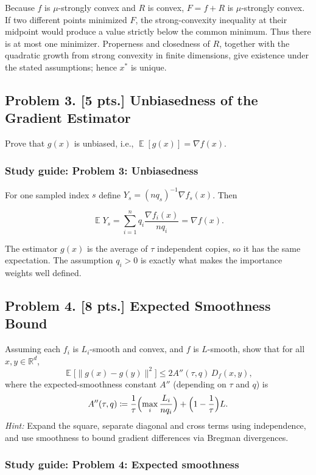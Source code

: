 \documentclass[11pt,a4paper]{article}
\DeclareMathOperator{\E}{\mathbb{E}}
\begin{document}
Because $f$ is $\mu$-strongly convex and $R$ is convex, $F=f+R$ is $\mu$-strongly convex. If two different points minimized $F$, the strong-convexity inequality at their midpoint would produce a value strictly below the common minimum. Thus there is at most one minimizer. Properness and closedness of $R$, together with the quadratic growth from strong convexity in finite dimensions, give existence under the stated assumptions; hence $x^*$ is unique.



\subsection{Problem 3. [5 pts.] Unbiasedness of the Gradient Estimator}
Prove that $g(x)$ is unbiased, i.e., $\E[g(x)] = \nabla f(x)$.


\subsubsection{Study guide: Problem 3: Unbiasedness}

For one sampled index $s$ define $Y_s=(nq_s)^{-1}\nabla f_s(x)$. Then

\[
\E Y_s=\sum_{i=1}^nq_i\frac{\nabla f_i(x)}{nq_i}=\nabla f(x).
\]

The estimator $g(x)$ is the average of $\tau$ independent copies, so it has the same expectation. The assumption $q_i>0$ is exactly what makes the importance weights well defined.



\subsection{Problem 4. [8 pts.] Expected Smoothness Bound}
Assuming each $f_i$ is $L_i$-smooth and convex, and $f$ is $L$-smooth, show that for all $x, y \in \mathbb{R}^{d}$,
\[
\E\bigl[ \|g(x) - g(y)\|^{2} \bigr] \le 2 A''(\tau, q)\, D_f(x, y),
\]
where the expected-smoothness constant $A''$ (depending on $\tau$ and $q$) is
\[
A''(\tau, q) \coloneqq \frac{1}{\tau} \Bigl( \max_i \frac{L_i}{n q_i} \Bigr) + \Bigl(1 - \frac{1}{\tau}\Bigr) L.
\]
\textit{Hint:} Expand the square, separate diagonal and cross terms using independence, and use smoothness to bound gradient differences via Bregman divergences.


\subsubsection{Study guide: Problem 4: Expected smoothness}
\end{document}
